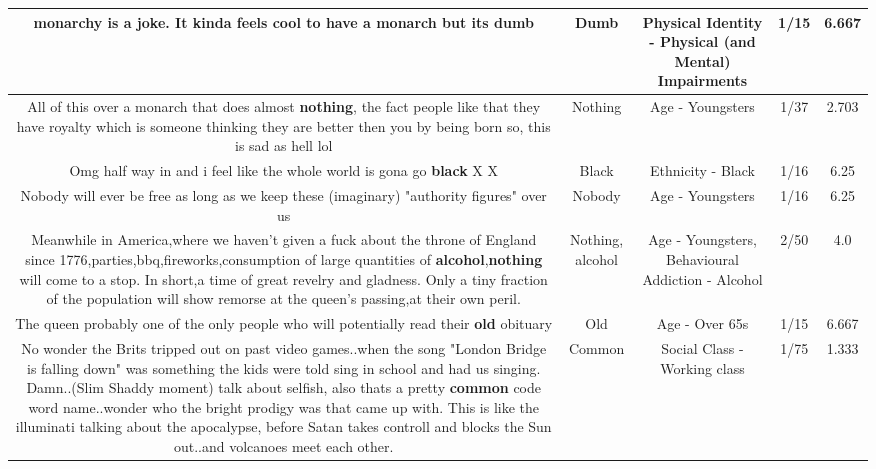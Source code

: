 \documentclass[11pt]{article}
\newlength\mylength
\begin{document}
\begin{center}
\begin{longtable}{|C{.65\mylength}|C{.30\mylength}|C{.12\mylength}|C{.12\mylength}|C{.12\mylength}|}
  \small monarchy is a joke. It kinda feels cool to have a monarch but its dumb\normalsize   & Dumb & Physical Identity - Physical (and Mental) Impairments & 1/15 & 6.667 \\  \hline
  \small All of this over a monarch that does almost \textbf{nothing}, the fact people like that they have royalty which is someone thinking they are better then you by being born so, this is sad as hell lol\normalsize   & Nothing & Age - Youngsters & 1/37 & 2.703 \\  \hline
  \small Omg half way in and i feel like the whole world is gona go \textbf{black} X X\normalsize   & Black & Ethnicity - Black & 1/16 & 6.25 \\  \hline
  \small Nobody will ever be free as long as we keep these (imaginary) "authority figures" over us\normalsize   & Nobody & Age - Youngsters & 1/16 & 6.25 \\  \hline
  \small Meanwhile in America,where we haven't given a fuck about the throne of England since 1776,parties,bbq,fireworks,consumption of large quantities of \textbf{alcohol},\textbf{nothing} will come to a stop. In short,a time of great revelry and gladness. Only a tiny fraction of the population will show remorse at the queen's passing,at their own peril.\normalsize   & Nothing, alcohol & Age - Youngsters, Behavioural Addiction - Alcohol & 2/50 & 4.0 \\  \hline
  \small The queen probably one of the only people who will potentially read their \textbf{old} obituary\normalsize   & Old & Age - Over 65s & 1/15 & 6.667 \\  \hline
  \small No wonder the Brits tripped out on past video games..when the song "London Bridge is falling down" was something the kids were told sing in school and had us singing. Damn..(Slim Shaddy moment) talk about selfish, also thats a pretty \textbf{common} code word name..wonder who the bright prodigy was that came up with. This is like the illuminati talking about the apocalypse, before Satan takes controll and blocks the Sun out..and volcanoes meet each other.\normalsize   & Common & Social Class - Working class & 1/75 & 1.333 \\  \hline

\end{longtable}
\end{center}
\end{document}
